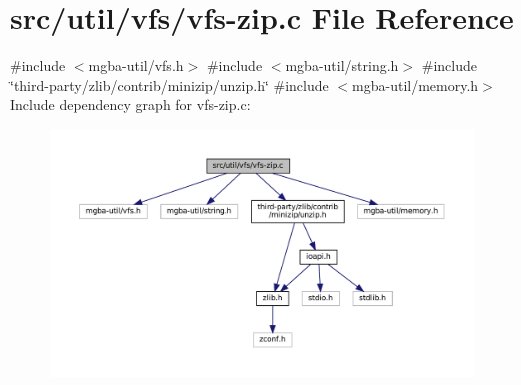 \hypertarget{vfs-zip_8c}{}\section{src/util/vfs/vfs-\/zip.c File Reference}
\label{vfs-zip_8c}
{\ttfamily \#include $<$mgba-\/util/vfs.\+h$>$}\newline
{\ttfamily \#include $<$mgba-\/util/string.\+h$>$}\newline
{\ttfamily \#include \char`\"{}third-\/party/zlib/contrib/minizip/unzip.\+h\char`\"{}}\newline
{\ttfamily \#include $<$mgba-\/util/memory.\+h$>$}\newline
Include dependency graph for vfs-\/zip.c\+:
\nopagebreak
\begin{figure}[H]
\begin{center}
\leavevmode
\includegraphics[width=350pt]{vfs-zip_8c__incl}
\end{center}
\end{figure}
